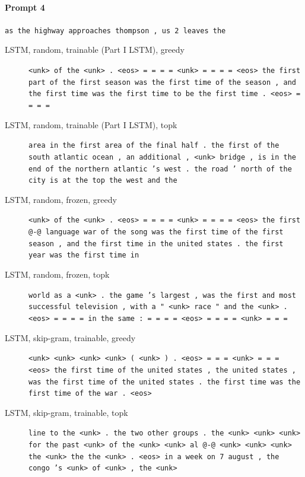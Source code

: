 \paragraph{Prompt 4} \texttt{as the highway approaches thompson , us 2 leaves the}
\begin{description}
\item[LSTM, random, trainable (Part I LSTM), greedy] \texttt{\small \textless{}unk\textgreater{} of the \textless{}unk\textgreater{} . \textless{}eos\textgreater{} = = = = \textless{}unk\textgreater{} = = = = \textless{}eos\textgreater{} the first part of the first season was the first time of the season , and the first time was the first time to be the first time . \textless{}eos\textgreater{} = = = =}
\item[LSTM, random, trainable (Part I LSTM), topk] \texttt{\small area in the first area of the final half . the first of the south atlantic ocean , an additional , \textless{}unk\textgreater{} bridge , is in the end of the northern atlantic 's west . the road ' north of the city is at the top the west and the}
\item[LSTM, random, frozen, greedy] \texttt{\small \textless{}unk\textgreater{} of the \textless{}unk\textgreater{} . \textless{}eos\textgreater{} = = = = \textless{}unk\textgreater{} = = = = \textless{}eos\textgreater{} the first @-@ language war of the song was the first time of the first season , and the first time in the united states . the first year was the first time in}
\item[LSTM, random, frozen, topk] \texttt{\small world as a \textless{}unk\textgreater{} . the game 's largest , was the first and most successful television , with a " \textless{}unk\textgreater{} race " and the \textless{}unk\textgreater{} . \textless{}eos\textgreater{} = = = = in the same : = = = = \textless{}eos\textgreater{} = = = = \textless{}unk\textgreater{} = = =}
\item[LSTM, skip-gram, trainable, greedy] \texttt{\small \textless{}unk\textgreater{} \textless{}unk\textgreater{} \textless{}unk\textgreater{} \textless{}unk\textgreater{} ( \textless{}unk\textgreater{} ) . \textless{}eos\textgreater{} = = = \textless{}unk\textgreater{} = = = \textless{}eos\textgreater{} the first time of the united states , the united states , was the first time of the united states . the first time was the first time of the war . \textless{}eos\textgreater{}}
\item[LSTM, skip-gram, trainable, topk] \texttt{\small line to the \textless{}unk\textgreater{} . the two other groups . the \textless{}unk\textgreater{} \textless{}unk\textgreater{} \textless{}unk\textgreater{} for the past \textless{}unk\textgreater{} of the \textless{}unk\textgreater{} \textless{}unk\textgreater{} al @-@ \textless{}unk\textgreater{} \textless{}unk\textgreater{} \textless{}unk\textgreater{} the \textless{}unk\textgreater{} the the \textless{}unk\textgreater{} . \textless{}eos\textgreater{} in a week on 7 august , the congo 's \textless{}unk\textgreater{} of \textless{}unk\textgreater{} , the \textless{}unk\textgreater{}}

\end{description}
